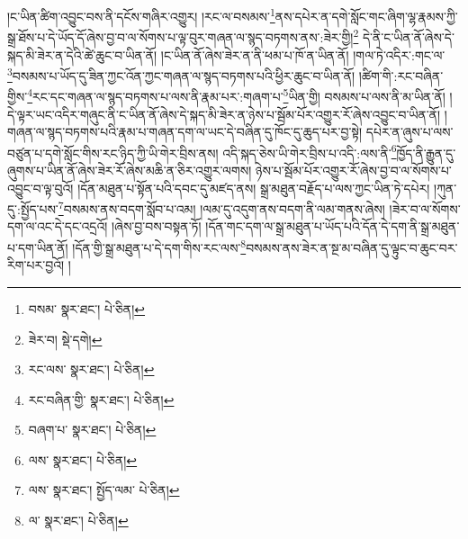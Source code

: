 །ང་ཡིན་ཚིག་འབྱུང་བས་ནི་དངོས་གཞིར་འགྱུར། །རང་ལ་བསམས་\footnote{བསམ་  སྣར་ཐང་།  པེ་ཅིན། }ནས་དཔེར་ན་དགེ་སློང་གང་ཞིག་ལྷ་རྣམས་ཀྱི་སྒྲ་ཐོས་པ་དེ་ཡོད་དོ་ཞེས་བྱ་བ་ལ་སོགས་པ་ལྟ་བུར་གཞན་ལ་སྙད་བཏགས་ནས་:ཟེར་གྱི།\footnote{ཟེར་བ།  སྡེ་དགེ། } དེ་ནི་ང་ཡིན་ནོ་ཞེས་དེ་སྐད་མི་ཟེར་ན་དེའི་ཚེ་ཆུང་བ་ཡིན་ནོ། །ང་ཡིན་ནོ་ཞེས་ཟེར་ན་ནི་ཕམ་པ་ཁོ་ན་ཡིན་ནོ། །གལ་ཏེ་འདིར་:གང་ལ་\footnote{རང་ལས་  སྣར་ཐང་།  པེ་ཅིན། }བསམས་པ་ཡོད་དུ་ཟིན་ཀྱང་འོན་ཀྱང་གཞན་ལ་སྙད་བཏགས་པའི་ཕྱིར་ཆུང་བ་ཡིན་ནོ། །ཚིག་གི་:རང་བཞིན་གྱིས་\footnote{རང་བཞིན་གྱི་  སྣར་ཐང་།  པེ་ཅིན། }རང་དང་གཞན་ལ་སྙད་བཏགས་པ་ལས་ནི་རྣམ་པར་:གཞག་པ་\footnote{བཞག་པ་  སྣར་ཐང་།  པེ་ཅིན། }ཡིན་གྱི། བསམས་པ་ལས་ནི་མ་ཡིན་ནོ། །དེ་ལྟར་ཡང་འདིར་གཞུང་ནི་ང་ཡིན་ནོ་ཞེས་དེ་སྐད་མི་ཟེར་ན་ཉེས་པ་སྦོམ་པོར་འགྱུར་རོ་ཞེས་འབྱུང་བ་ཡིན་ནོ། །གཞན་ལ་སྙད་བཏགས་པའི་རྣམ་པ་གཞན་དག་ལ་ཡང་དེ་བཞིན་དུ་ཁོང་དུ་ཆུད་པར་བྱ་སྟེ། དཔེར་ན་ཞུས་པ་ལས་བཙུན་པ་དགེ་སློང་གིས་རང་ཉིད་ཀྱི་ཡི་གེར་བྲིས་ནས། འདི་སྐད་ཅེས་ཡི་གེར་བྲིས་པ་འདི་:ལས་ནི་\footnote{ལས་  སྣར་ཐང་།  པེ་ཅིན། }ཁྱོད་ནི་རྒྱུན་དུ་ཞུགས་པ་ཡིན་ནོ་ཞེས་ཟེར་རོ་ཞེས་མཆི་ན་ཅིར་འགྱུར་ལགས། ཉེས་པ་སྦོམ་པོར་འགྱུར་རོ་ཞེས་བྱ་བ་ལ་སོགས་པ་འབྱུང་བ་ལྟ་བུའོ། །དོན་མཐུན་པ་སྟོན་པའི་དབང་དུ་མཛད་ནས། སྒྲ་མཐུན་བརྗོད་པ་ལས་ཀྱང་ཡིན་ཏེ་དཔེར། །ཀུན་དུ་:སྤྱོད་པས་\footnote{ལས་  སྣར་ཐང་། སྤྱོད་ལམ་  པེ་ཅིན། }བསམས་ནས་བདག་སློབ་པ་འམ། །ལམ་དུ་འདུག་ནས་བདག་ནི་ལམ་གནས་ཞེས། །ཟེར་བ་ལ་སོགས་དག་ལ་འང་དེ་དང་འདྲའོ། །ཞེས་བྱ་བས་བསྟན་ཏོ། །དོན་གང་དག་ལ་སྒྲ་མཐུན་པ་ཡོད་པའི་དོན་དེ་དག་ནི་སྒྲ་མཐུན་པ་དག་ཡིན་ནོ། །དོན་གྱི་སྒྲ་མཐུན་པ་དེ་དག་གིས་རང་ལས་\footnote{ལ་  སྣར་ཐང་།  པེ་ཅིན། }བསམས་ནས་ཟེར་ན་སྔ་མ་བཞིན་དུ་ལྟུང་བ་ཆུང་བར་རིག་པར་བྱའོ། །
